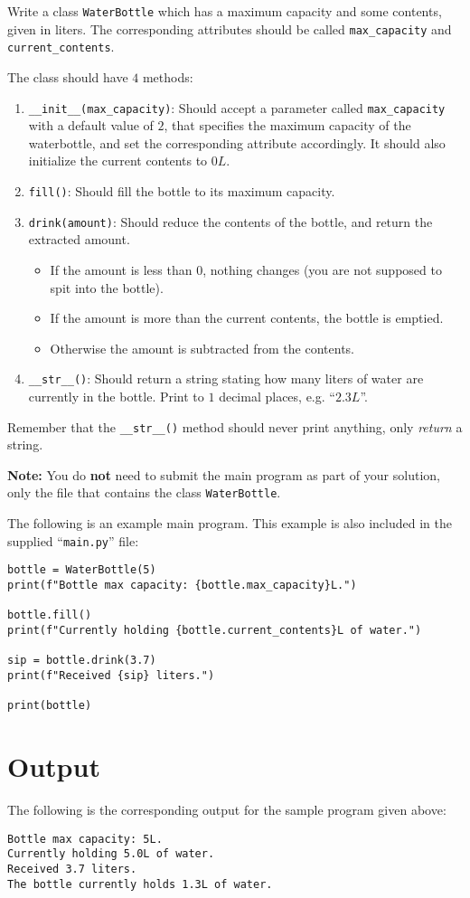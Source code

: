
Write a class \texttt{WaterBottle} which has a maximum capacity and some contents, given in liters.
The corresponding attributes should be called \texttt{max\_capacity} and \texttt{current\_contents}.

The class should have $4$ methods:
\begin{enumerate}
    \item \texttt{\_\_init\_\_(max\_capacity)}:
    Should accept a parameter called \texttt{max\_capacity} with a default value of $2$,
    that specifies the maximum capacity of the waterbottle,
    and set the corresponding attribute accordingly.
    It should also initialize the current contents to $0L$.

    \item \texttt{fill()}:
    Should fill the bottle to its maximum capacity.

    \item \texttt{drink(amount)}:
    Should reduce the contents of the bottle, and return the extracted amount.
    \begin{itemize}
        \item If the amount is less than $0$, nothing changes (you are not supposed to spit into the bottle).
        \item If the amount is more than the current contents, the bottle is emptied.
        \item Otherwise the amount is subtracted from the contents.
    \end{itemize}

    \item \texttt{\_\_str\_\_()}:
    Should return a string stating how many liters of water are currently in the bottle.
    Print to $1$ decimal places, e.g. ``$2.3L$''.
\end{enumerate}

Remember that the \texttt{\_\_str\_\_()} method should never print anything, only \emph{return} a string.

\textbf{Note:} You do \textbf{not} need to submit the main program as part of your solution,
only the file that contains the class \texttt{WaterBottle}.

The following is an example main program.
This example is also included in the supplied ``\texttt{main.py}'' file:
   
\begin{verbatim}
bottle = WaterBottle(5)
print(f"Bottle max capacity: {bottle.max_capacity}L.")

bottle.fill()
print(f"Currently holding {bottle.current_contents}L of water.")

sip = bottle.drink(3.7)
print(f"Received {sip} liters.")

print(bottle)
\end{verbatim}


\section*{Output}

The following is the corresponding output for the sample program given above:
\begin{verbatim}
Bottle max capacity: 5L.
Currently holding 5.0L of water.
Received 3.7 liters.
The bottle currently holds 1.3L of water.
\end{verbatim}
